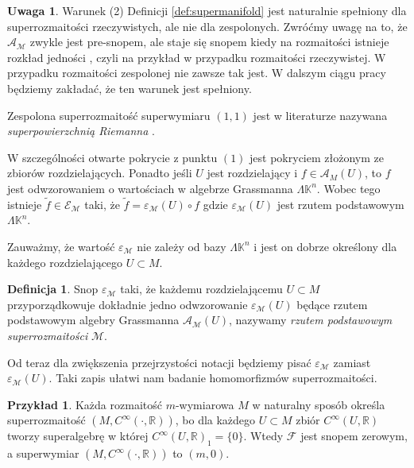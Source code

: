 \documentclass[11pt,a4paper]{report}
\theoremstyle{definition}
\newtheorem{example}[theorem]{Przykład}
\newtheorem{definition}[theorem]{Definicja}
\newtheorem{remark}[theorem]{Uwaga}
\begin{document}
\begin{remark}
	Warunek (2) Definicji \ref{def:supermanifold} jest naturalnie spełniony dla superrozmaitości rzeczywistych, ale nie dla zespolonych. Zwróćmy uwagę na to, że $\mathcal{A}_\mathcal{M}$ zwykle jest pre-snopem, ale staje się snopem kiedy na rozmaitości istnieje rozkład jedności \cite{covolo}, czyli na przykład w przypadku rozmaitości rzeczywistej. W przypadku rozmaitości zespolonej nie zawsze tak jest. W dalszym ciągu pracy będziemy zakładać, że ten warunek jest spełniony.
\end{remark}


Zespolona superrozmaitość superwymiaru $(1,1)$ jest w literaturze nazywana \textit{superpowierzchnią Riemanna} \cite{friedan}. 

W szczególności otwarte pokrycie z punktu $(1)$ jest pokryciem złożonym ze zbiorów rozdzielających. Ponadto jeśli $U$ jest rozdzielający i $f \in \mathcal{A}_M(U)$, to $f$ jest odwzorowaniem o wartościach w algebrze Grassmanna $\Lambda \mathbb{K}^n$. Wobec tego istnieje $\tilde{f} \in \mathcal{E}_\mathcal{M}$ taki, że $\tilde{f} = \varepsilon_\mathcal{M}(U) \circ f$ gdzie $\varepsilon_\mathcal{M}(U)$ jest rzutem podstawowym $\Lambda \mathbb{K}^n$.

Zauważmy, że wartość $\varepsilon_\mathcal{M}$ nie zależy od bazy $\Lambda \mathbb{K}^n$ i jest on dobrze określony dla każdego rozdzielającego $U \subset M$.

\begin{definition}
	Snop $\varepsilon_\mathcal{M}$ taki, że każdemu rozdzielającemu $U \subset M$ przyporządkowuje dokładnie jedno odwzorowanie $\varepsilon_\mathcal{M} (U)$ będące rzutem podstawowym algebry Grassmanna $\mathcal{A}_\mathcal{M} (U)$, nazywamy \textit{rzutem podstawowym superrozmaitości} $\mathcal{M}$.
\end{definition}

Od teraz dla zwiększenia przejrzystości notacji będziemy pisać $\varepsilon_\mathcal{M}$ zamiast $\varepsilon_\mathcal{M} (U)$. Taki zapis ułatwi nam badanie homomorfizmów superrozmaitości.

\begin{example}
	Każda rozmaitość $m$-wymiarowa $M$ w naturalny sposób określa superrozmaitość $(M,C^\infty(\cdot, \mathbb{R}))$, bo dla każdego $U\subset M$ zbiór $C^\infty (U, \mathbb{R})$ tworzy superalgebrę w której $C^\infty (U, \mathbb{R})_1 = \{ 0 \}$. Wtedy $\mathcal{F}$ jest snopem zerowym, a superwymiar $(M,C^\infty(\cdot, \mathbb{R}))$ to $(m,0)$.
\end{example}
\end{document}
